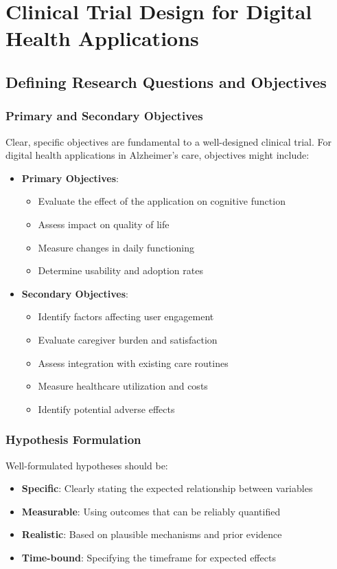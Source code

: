 \chapter{Clinical Trial Design for Digital Health Applications}

\section{Defining Research Questions and Objectives}
\subsection{Primary and Secondary Objectives}
Clear, specific objectives are fundamental to a well-designed clinical trial. For digital health applications in Alzheimer's care, objectives might include:

\begin{itemize}
    \item \textbf{Primary Objectives}:
    \begin{itemize}
        \item Evaluate the effect of the application on cognitive function
        \item Assess impact on quality of life
        \item Measure changes in daily functioning
        \item Determine usability and adoption rates
    \end{itemize}
    
    \item \textbf{Secondary Objectives}:
    \begin{itemize}
        \item Identify factors affecting user engagement
        \item Evaluate caregiver burden and satisfaction
        \item Assess integration with existing care routines
        \item Measure healthcare utilization and costs
        \item Identify potential adverse effects
    \end{itemize}
\end{itemize}

\subsection{Hypothesis Formulation}
Well-formulated hypotheses should be:
\begin{itemize}
    \item \textbf{Specific}: Clearly stating the expected relationship between variables
    \item \textbf{Measurable}: Using outcomes that can be reliably quantified
    \item \textbf{Realistic}: Based on plausible mechanisms and prior evidence
    \item \textbf{Time-bound}: Specifying the timeframe for expected effects
\end{itemize}

